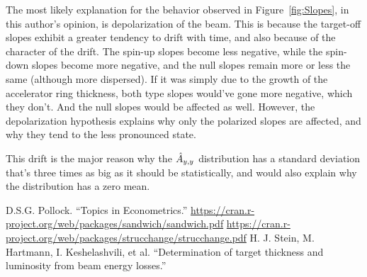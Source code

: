 \documentclass{article}
\begin{document}
The most likely explanation for the behavior observed in Figure~\ref{fig:Slopes}, in this author's opinion, is depolarization of the beam. This is because the target-off slopes exhibit a greater tendency to drift with time, and also because of the character of the drift. The spin-up slopes become less negative, while the spin-down slopes become more negative, and the null slopes remain more or less the same (although more dispersed). If it was simply due to the growth of the accelerator ring thickness, both type slopes would've gone more negative, which they don't. And the null slopes would be affected as well. However, the depolarization hypothesis explains why only the polarized slopes are  affected, and why they tend to the less pronounced state. 

This drift is the major reason why the $\Ayy*$ distribution has a standard deviation that's three times as big as it should be statistically, and would also explain why the distribution has a zero mean.

\begin{thebibliography}{9}
	D.S.G. Pollock. ``Topics in Econometrics.''
	\url{https://cran.r-project.org/web/packages/sandwich/sandwich.pdf}
	\url{https://cran.r-project.org/web/packages/strucchange/strucchange.pdf}
	H. J. Stein, M. Hartmann, I. Keshelashvili, et al. ``Determination of target thickness and luminosity from beam energy losses.''
\end{thebibliography}
\end{document}
